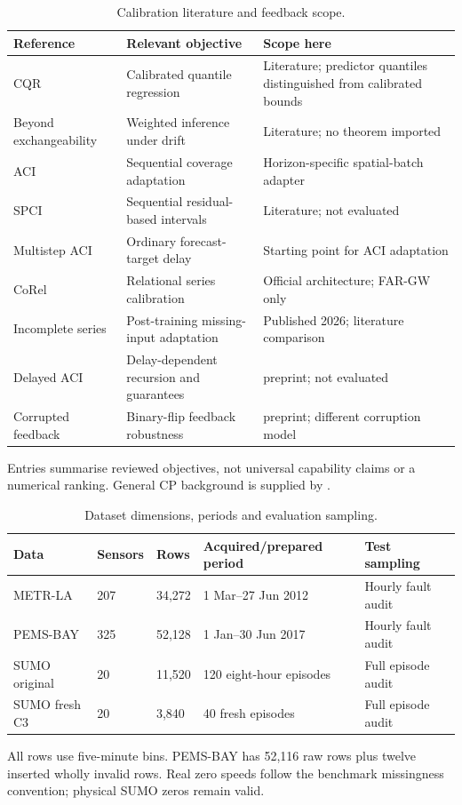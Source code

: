 \begin{table}[p]\caption{Calibration literature and feedback scope.}\label{tab:related-calibration}\centering\small
\begin{tabular}{>{\raggedright\arraybackslash}p{3.6cm}>{\raggedright\arraybackslash}p{4.0cm}>{\raggedright\arraybackslash}p{4.7cm}}\toprule
Reference & Relevant objective & Scope here \\\midrule
CQR \citep{romano2019} & Calibrated quantile regression & Literature; predictor quantiles distinguished from calibrated bounds \\
Beyond exchangeability \citep{barber2023} & Weighted inference under drift & Literature; no theorem imported \\
ACI \citep{gibbs2021} & Sequential coverage adaptation & Horizon-specific spatial-batch adapter \\
SPCI \citep{xu2023} & Sequential residual-based intervals & Literature; not evaluated \\
Multistep ACI \citep{hallberg2024} & Ordinary forecast-target delay & Starting point for ACI adaptation \\
CoRel \citep{cini2025} & Relational series calibration & Official architecture; FAR-GW only \\
Incomplete series \citep{chen2026} & Post-training missing-input adaptation & Published 2026; literature comparison \\
Delayed ACI \citep{elhalabi2026} & Delay-dependent recursion and guarantees & 2026 preprint; not evaluated \\
Corrupted feedback \citep{wang2026} & Binary-flip feedback robustness & 2026 preprint; different corruption model \\
\bottomrule\end{tabular}\par\smallskip\footnotesize Entries summarise reviewed objectives, not universal capability claims or a numerical ranking. General CP background is supplied by \citet{angelopoulos2021}.\end{table}\clearpage
\begin{table}[p]
\caption{Dataset dimensions, periods and evaluation sampling.}\label{tab:data}
\centering\small
\begin{tabular}{lllll}\toprule
Data & Sensors & Rows & Acquired/prepared period & Test sampling \\\midrule
METR-LA & 207 & 34,272 & 1 Mar--27 Jun 2012 & Hourly fault audit \\
PEMS-BAY & 325 & 52,128 & 1 Jan--30 Jun 2017 & Hourly fault audit \\
SUMO original & 20 & 11,520 & 120 eight-hour episodes & Full episode audit \\
SUMO fresh C3 & 20 & 3,840 & 40 fresh episodes & Full episode audit \\
\bottomrule\end{tabular}
\par\smallskip\footnotesize All rows use five-minute bins. PEMS-BAY has 52,116 raw rows plus twelve inserted wholly invalid rows. Real zero speeds follow the benchmark missingness convention; physical SUMO zeros remain valid.
\end{table}\clearpage
